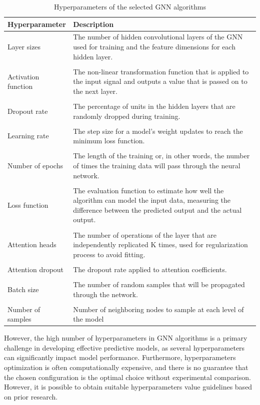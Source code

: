 \begin{table}[!ht]
\centering
\caption{Hyperparameters of the selected GNN algorithms \label{tab:hyperparameters_gnns}}
\begin{tabularx}{\textwidth}{lX}
\hline
Hyperparameter & Description \\ \hline
Layer sizes & The number of hidden convolutional layers of the GNN used for training and the feature dimensions for each hidden layer.\\
 &  \\
Activation function & The non-linear transformation function that is applied to the input signal and outputs a value that is passed on to the next layer. \\
 &  \\
Dropout rate & The percentage of units in the hidden layers that are randomly dropped during training.\\
 &  \\
Learning rate & The step size for a model's weight updates to reach the minimum loss function.\\
 &  \\
Number of epochs & The length of the training or, in other words, the number of times the training data will pass through the neural network.\\
 &  \\
Loss function & The evaluation function to estimate how well the algorithm can model the input data, measuring the difference between the predicted output and the actual output. \\
 &  \\
Attention heads & The number of operations of the layer that are independently replicated K times, used for regularization process to avoid fitting.  \\
 &  \\
Attention dropout & The dropout rate applied to attention coefficients. \\
 &  \\
Batch size & The number of random samples that will be propagated through the network. \\
 &  \\
Number of samples & Number of neighboring nodes to sample at each level of the model \\ \hline
\end{tabularx}
\end{table}

However, the high number of hyperparameters in GNN algorithms is a primary challenge in developing effective predictive models, as several hyperparameters can significantly impact model performance. Furthermore, hyperparameters optimization is often computationally expensive, and there is no guarantee that the chosen configuration is the optimal choice without experimental comparison. However, it is possible to obtain suitable hyperparameters value guidelines based on prior research.
 
